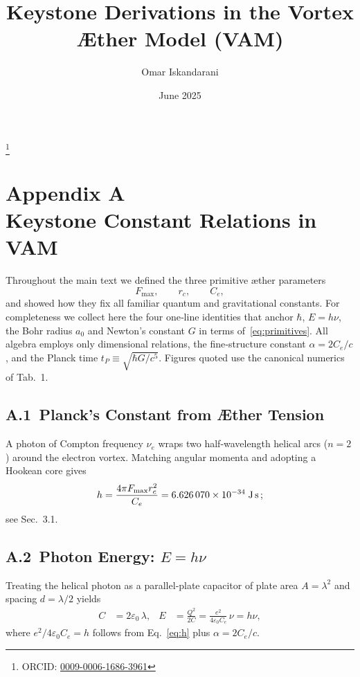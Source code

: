 \documentclass[a4paper, aps,preprint,superscriptaddress, 12pt]{revtex4}
\begin{document}
    \title{Keystone Derivations in the Vortex Æther Model (VAM)}
    \author{Omar Iskandarani}
    \date{June 2025}
    \thanks{ORCID: \href{https://orcid.org/0009-0006-1686-3961}{0009-0006-1686-3961}}

    \section*{Appendix A  \\  Keystone Constant Relations in VAM}

    Throughout the main text we defined the three primitive æther parameters
    \begin{equation}
    F_{\max}, \qquad r_c, \qquad C_e,
    \label{eq:primitives}
    \end{equation}
    and showed how they fix all familiar quantum and gravitational constants.
    For completeness we collect here the four one‑line identities that anchor
    \(\hbar\), \(E=h\nu\), the Bohr radius \(a_0\) and Newton's constant \(G\)
    in terms of~\eqref{eq:primitives}.
    All algebra employs only dimensional relations, the fine‑structure constant
    \(\alpha=2C_e/c\), and the Planck time
    \(t_P\equiv\sqrt{\hbar G/c^{5}}\). Figures quoted use the canonical
    numerics of Tab.~1.

    \subsection*{A.1\, Planck's Constant from Æther Tension}
    A photon of Compton frequency \(\nu_e\) wraps two half‑wavelength
    helical arcs (\(n=2\)) around the electron vortex. Matching
    angular momenta and adopting a Hookean core gives
    \begin{equation}
        h = \frac{4\pi F_{\max} r_c^{2}}{C_e}
        = 6.626\,070\times10^{-34}\;\text{J\,s}\,;
        \label{eq:h}
    \end{equation}
    see Sec.~3.1.

    \subsection*{A.2\, Photon Energy: \(E=h\nu\)}
    Treating the helical photon as a parallel‑plate capacitor of plate area
    \(A=\lambda^{2}\) and spacing \(d=\lambda/2\) yields
    \begin{align}
        C &= 2\varepsilon_0\,\lambda, &
        E &= \frac{Q^{2}}{2C} = \frac{e^{2}}{4\varepsilon_{0}C_e}\,\nu
        = h\nu,
        \label{eq:Einstein}
    \end{align}
    where \(e^{2}/4\varepsilon_{0}C_e=h\) follows from Eq.~\eqref{eq:h} plus
    \(\alpha=2C_e/c\).
\end{document}
